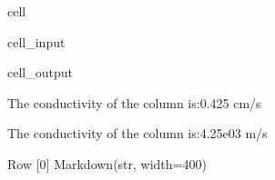 \documentclass[letterpaper,10pt,english]{jupyterBook}
\begin{document}
\begin{sphinxuseclass}{cell}
\begin{sphinxVerbatimInput}
\begin{sphinxuseclass}{cell_input}
\begin{sphinxVerbatim}[commandchars=\\\{\}]
  
   

\end{sphinxVerbatim}

\end{sphinxuseclass}\end{sphinxVerbatimInput}
\begin{sphinxVerbatimOutput}

\begin{sphinxuseclass}{cell_output}
\begin{sphinxVerbatim}[commandchars=\\\{\}]

The conductivity of the column is:0.425 cm/s 

The conductivity of the column is:4.25e\PYGZhy{}03 m/s
\end{sphinxVerbatim}

\begin{sphinxVerbatim}[commandchars=\\\{\}]
Row
    [0] Markdown(str, width=400)
\end{sphinxVerbatim}

\end{sphinxuseclass}\end{sphinxVerbatimOutput}

\end{sphinxuseclass}
\end{document}

